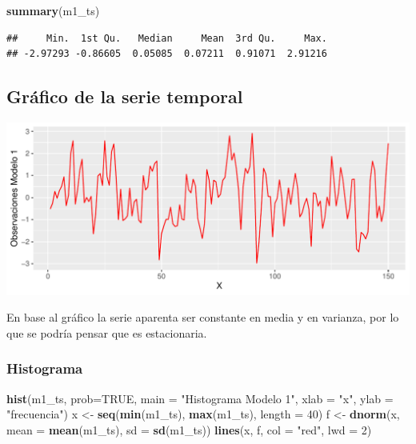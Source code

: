 \documentclass[
  11pt,
]{article}
\newenvironment{Shaded}{\begin{snugshade}}{\end{snugshade}}
\newcommand{\DataTypeTok}[1]{\textcolor[rgb]{0.13,0.29,0.53}{#1}}
\newcommand{\DecValTok}[1]{\textcolor[rgb]{0.00,0.00,0.81}{#1}}
\newcommand{\KeywordTok}[1]{\textcolor[rgb]{0.13,0.29,0.53}{\textbf{#1}}}
\newcommand{\NormalTok}[1]{#1}
\newcommand{\OtherTok}[1]{\textcolor[rgb]{0.56,0.35,0.01}{#1}}
\newcommand{\StringTok}[1]{\textcolor[rgb]{0.31,0.60,0.02}{#1}}
\begin{document}
\begin{Shaded}
\begin{Highlighting}[]
\KeywordTok{summary}\NormalTok{(m1_ts)}
\end{Highlighting}
\end{Shaded}

\begin{verbatim}
##     Min.  1st Qu.   Median     Mean  3rd Qu.     Max. 
## -2.97293 -0.86605  0.05085  0.07211  0.91071  2.91216
\end{verbatim}

\hypertarget{gruxe1fico-de-la-serie-temporal}{%
\subsection{Gráfico de la serie
temporal}\label{gruxe1fico-de-la-serie-temporal}}

\begin{center}\includegraphics[width=0.9\linewidth]{RmdFigs/plot_ts1-1} \end{center}

En base al gráfico la serie aparenta ser constante en media y en
varianza, por lo que se podría pensar que es estacionaria.

\hypertarget{histograma}{%
\subsubsection{Histograma}\label{histograma}}

\begin{Shaded}
\begin{Highlighting}[]
\KeywordTok{hist}\NormalTok{(m1_ts, }\DataTypeTok{prob=}\OtherTok{TRUE}\NormalTok{, }\DataTypeTok{main =} \StringTok{"Histograma Modelo 1"}\NormalTok{, }\DataTypeTok{xlab =} \StringTok{"x"}\NormalTok{, }\DataTypeTok{ylab =} \StringTok{"frecuencia"}\NormalTok{)}
\NormalTok{x <-}\StringTok{ }\KeywordTok{seq}\NormalTok{(}\KeywordTok{min}\NormalTok{(m1_ts), }\KeywordTok{max}\NormalTok{(m1_ts), }\DataTypeTok{length =} \DecValTok{40}\NormalTok{)}
\NormalTok{f <-}\StringTok{ }\KeywordTok{dnorm}\NormalTok{(x, }\DataTypeTok{mean =} \KeywordTok{mean}\NormalTok{(m1_ts), }\DataTypeTok{sd =} \KeywordTok{sd}\NormalTok{(m1_ts))}
\KeywordTok{lines}\NormalTok{(x, f, }\DataTypeTok{col =} \StringTok{"red"}\NormalTok{, }\DataTypeTok{lwd =} \DecValTok{2}\NormalTok{)}
\end{Highlighting}
\end{Shaded}
\end{document}

